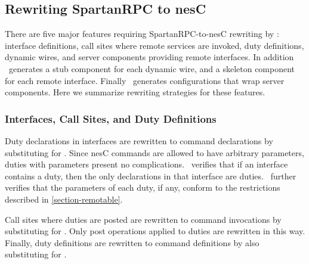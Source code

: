 \subsection{Rewriting SpartanRPC to nesC}

There are five major features requiring SpartanRPC-to-nesC rewriting by
\Sprocket: interface definitions, call sites where remote services are
invoked, duty definitions, dynamic wires, and server components
providing remote interfaces. In addition \Sprocket\ generates a stub
component for each dynamic wire, and a skeleton component for each
remote interface. Finally \Sprocket\ generates configurations that wrap
server components. Here we summarize rewriting strategies for these
features.


\subsubsection{Interfaces, Call Sites, and Duty Definitions}

Duty declarations in interfaces are rewritten to command declarations by
substituting  for . Since nesC commands are
allowed to have arbitrary parameters, duties with parameters present no
complications. \Sprocket\ verifies that if an interface contains a duty,
then the only declarations in that interface are duties. \Sprocket\
further verifies that the parameters of each duty, if any, conform to
the restrictions described in \autoref{section-remotable}.


Call sites where duties are posted are rewritten to command invocations
by substituting \code{call} for \code{post}. Only post operations
applied to duties are rewritten in this way. Finally, duty definitions
are rewritten to command definitions by also substituting 
for \code{duty}.

